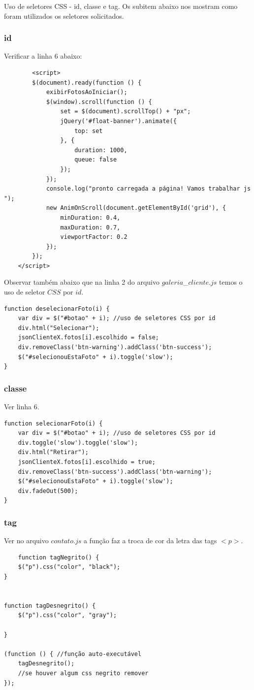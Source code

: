 	Uso de seletores CSS - id, classe e tag. Os subitem abaixo nos mostram como foram utilizados os seletores solicitados.
	
\subsubsection{id}
	Verificar a linha $6$ abaixo:
		\begin{lstlisting}
	    <script>
        $(document).ready(function () {
            exibirFotosAoIniciar();
            $(window).scroll(function () {
                set = $(document).scrollTop() + "px";
                jQuery('#float-banner').animate({
                    top: set
                }, {
                    duration: 1000,
                    queue: false
                });
            });
            console.log("pronto carregada a página! Vamos trabalhar js ");
            new AnimOnScroll(document.getElementById('grid'), {
                minDuration: 0.4,
                maxDuration: 0.7,
                viewportFactor: 0.2
            });
        });
    </script>
	\end{lstlisting}

	Observar também abaixo que na linha 2 do arquivo $galeria$\_$cliente.js$ temos o uso de seletor $CSS$ por $id$.
	
\begin{lstlisting}
function deselecionarFoto(i) {
    var div = $("#botao" + i); //uso de seletores CSS por id
    div.html("Selecionar");
    jsonClienteX.fotos[i].escolhido = false;
    div.removeClass('btn-warning').addClass('btn-success');
    $("#selecionouEstaFoto" + i).toggle('slow');
}
\end{lstlisting}

\subsubsection{classe}
	Ver linha $6$.
\begin{lstlisting}
function selecionarFoto(i) {
    var div = $("#botao" + i); //uso de seletores CSS por id
    div.toggle('slow').toggle('slow');
    div.html("Retirar");
    jsonClienteX.fotos[i].escolhido = true;
    div.removeClass('btn-success').addClass('btn-warning');
    $("#selecionouEstaFoto" + i).toggle('slow');
    div.fadeOut(500);
}
\end{lstlisting}

\subsubsection{tag}
	Ver no arquivo $contato.js$ a função faz a troca de cor da letra das tags $<p>$.
\begin{lstlisting}
	function tagNegrito() {
    $("p").css("color", "black");
}


function tagDesnegrito() {
    $("p").css("color", "gray");

}

(function () { //função auto-executável
    tagDesnegrito();
    //se houver algum css negrito remover
});

\end{lstlisting}
